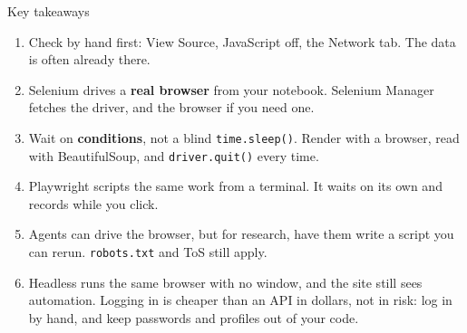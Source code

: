 \documentclass[9pt,aspectratio=169]{beamer}
\begin{document}
\begin{frame}{Key takeaways}
    \begin{enumerate}
        \item Check by hand first: View Source, JavaScript off, the Network tab. The data is often already there.
        \item Selenium drives a \textbf{real browser} from your notebook. Selenium Manager fetches the driver, and the browser if you need one.
        \item Wait on \textbf{conditions}, not a blind \texttt{time.sleep()}. Render with a browser, read with BeautifulSoup, and \texttt{driver.quit()} every time.
        \item Playwright scripts the same work from a terminal. It waits on its own and records while you click.
        \item Agents can drive the browser, but for research, have them write a script you can rerun. \texttt{robots.txt} and ToS still apply.
        \item Headless runs the same browser with no window, and the site still sees automation. Logging in is cheaper than an API in dollars, not in risk: log in by hand, and keep passwords and profiles out of your code.
    \end{enumerate}
    \bigskip
\end{frame}
\end{document}
